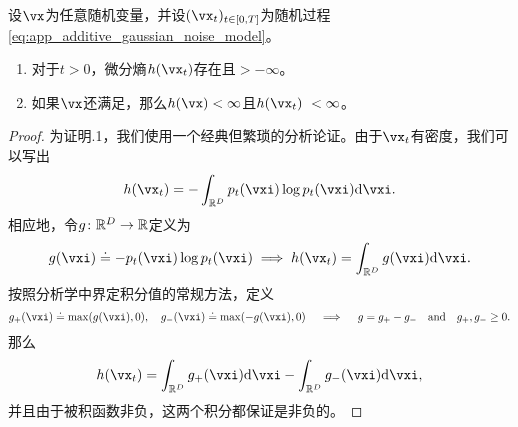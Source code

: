 \documentclass[../../book-main_zh.tex]{subfiles}
\begin{document}
\begin{lemma}\label{lem:diffusion_entropy_exists}
    设\(\vx\)为任意随机变量，并设\((\vx_{t})_{t \in [0, T]}\)为随机过程\eqref{eq:app_additive_gaussian_noise_model}。
    \begin{enumerate}
        \item 对于\(t > 0\)，微分熵\(h(\vx_{t})\)存在且\(> -\infty\)。
        \item 如果\(\vx\)还满足，那么\(h(\vx) < \infty\)且\(h(\vx_{t})\ < \infty\)。
    \end{enumerate}
\end{lemma}
\begin{proof}
    为证明.1，我们使用一个经典但繁琐的分析论证。由于\(\vx_{t}\)有密度，我们可以写出
    \begin{equation}
        h(\vx_{t}) = -\int_{\R^{D}}p_{t}(\vxi)\log p_{t}(\vxi) \odif{\vxi}.
    \end{equation}
    相应地，令\(g \colon \mathbb{R}^{D} \to \mathbb{R}\)定义为
    \begin{equation}
        g(\vxi) \doteq -p_{t}(\vxi)\log p_{t}(\vxi) \implies h(\vx_{t}) = \int_{\R^{D}}g(\vxi)\odif{\vxi}.
    \end{equation}
    按照分析学中界定积分值的常规方法，定义
    \begin{equation}
        g_{+}(\vxi) \doteq \max(g(\vxi), 0), \quad g_{-}(\vxi) \doteq \max(-g(\vxi), 0) \quad \implies \quad g = g_{+} - g_{-}\quad \text{and} \quad g_{+}, g_{-} \geq 0.
    \end{equation}
    那么
    \begin{equation}
        h(\vx_{t}) = \int_{\R^{D}}g_{+}(\vxi)\odif{\vxi} - \int_{\R^{D}}g_{-}(\vxi)\odif{\vxi},
    \end{equation}
    并且由于被积函数非负，这两个积分都保证是非负的。
    

\end{proof}
\end{document}
